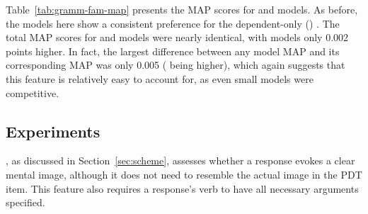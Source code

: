 Table~\ref{tab:gramm-fam-map} presents the  MAP scores for  and  models. As before, the models here show a consistent preference for the dependent-only () . The total MAP scores for   and  models were nearly identical, with  models only 0.002 points higher. In fact, the largest difference between any  model MAP and its corresponding  MAP was only 0.005 ( being higher), which again suggests that this feature is relatively easy to account for, as even small  models were competitive.


\subsection{ Experiments}
\label{sec:map-interp}

, as discussed in Section~\ref{sec:scheme}, assesses whether a response evokes a clear mental image, although it does not need to resemble the actual image in the PDT item. This feature also requires a response's verb to have all necessary arguments specified.

